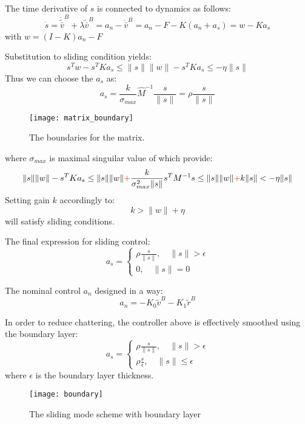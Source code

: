     The time derivative of $s$ is connected to dynamics as follows:
    $$
    \dot{s} = \dot{\tilde{\bar{v}}}^B + \lambda \tilde{\bar{v}}^B = 
    a_n - \dot{\bar{v}}^B = a_n - F - K(a_n + a_s) = w - Ka_s 
    $$
    with $w = (I - K)a_n - F $

    Substitution to sliding condition yields:
    $$
    s^Tw- s^TKa_s  \leq \|s\|\|w\| - s^TKa_s  \leq - \eta \|s\|
    $$
    Thus we can choose the $a_s$ as:
    $$
        a_s = \frac{k}{\sigma_{max}}\hat{M}^{-1}\frac{s}{\|s\|} = 
        \rho \frac{s}{\|s\|} 
    $$
    \begin{figure}[H]
        \centering\texttt{[image: matrix\_boundary]}
        \caption{The boundaries for the matrix.}
        \label{image:matrix_boundary}
    \end{figure}
    where $\sigma_{max}$ is maximal singuilar value of 
    which provide:
    $$
        \|s\|\|w\| - s^TKa_s \leq \|s\|\|w\| \textcolor{red}{+} 
        \frac{k}{\sigma^2_{max}\|s\|}s^TM^{-1}s \leq
        \|s\|\|w\| \textcolor{red}{+} k \|s\| < - \eta \|s\|
    $$
    Setting gain $k$ accordingly to:
    $$
        k > \|w\| + \eta
    $$
    will satisfy sliding conditions.

    The final expression for sliding control:
    $$    
    a_s = 
    \begin{cases}
    \rho \frac{s}{\|s\|}, \quad \|s\| >\epsilon\\
    0, \quad \|s\| = 0 
    \end{cases}
    $$

    The nominal control $a_n$
    designed in a way:
    $$
        a_n = - K_0\tilde{v}^B - K_1\tilde{r}^B
    $$

    In order to reduce chattering, the controller above is effectively smoothed using
    the boundary layer:
    $$
    a_s = 
    \begin{cases}
    \rho \frac{s}{\|s\|}, \quad \|s\| >\epsilon\\
    \rho \frac{s}{\epsilon}, \quad \|s\| \leq\epsilon
    \end{cases}
    $$
    where $\epsilon$ is the boundary layer thickness.

\begin{figure}[H]
    \centering\texttt{[image: boundary]}
    \caption{The sliding mode scheme with boundary layer}
    \label{image:boundary}
\end{figure}

